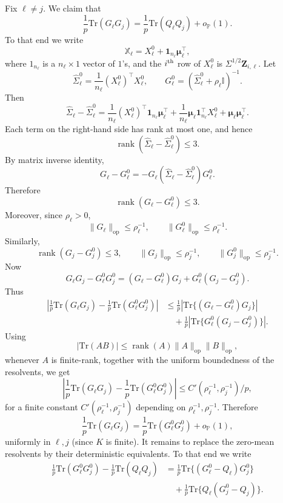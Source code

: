 \documentclass{article}
\theoremstyle{plain}
\theoremstyle{remark}
\def \bZ{\mathbf{Z}}
\def \tr {\mathrm{Tr}}
\def \I{\mathcal{I}}
\def \P{\mathbb{P}}
\def \bmu{\pmb{\mu}}
\def \bZ {{\boldsymbol{Z}}}
\def \I {\mathbb{I}}
\begin{document}
Fix \(\ell\neq j\). We claim that
\[
\frac{1}{p}\tr(G_\ell G_j)
=
\frac{1}{p}\tr(Q_\ell Q_j)
+
o_{\P}(1).
\]
To that end we write
\[
\mathbb{X}_\ell=X_\ell^0+\mathbf 1_{n_\ell}\bmu_\ell^\top,
\]
where $1_{n_\ell}$ is a $n_{\ell}\times 1$ vector of $1$'s, and the $i^{\rm th}$ row of \(X_\ell^0\) is \(\Sigma^{1/2}\bZ_{i,\ell}\). Let
\[
\widehat\Sigma_\ell^0
=
\frac{1}{n_\ell}(X_\ell^0)^\top X_\ell^0,
\qquad
G_\ell^0
=
(\widehat\Sigma_\ell^0+\rho_\ell \I)^{-1}.
\]
Then
\[
\widehat\Sigma_\ell-\widehat\Sigma_\ell^0
=
\frac{1}{n_\ell}(X_\ell^0)^\top \mathbf 1_{n_\ell}\bmu_\ell^\top
+
\frac{1}{n_\ell}\bmu_\ell\mathbf 1_{n_\ell}^\top X_\ell^0
+
\bmu_\ell\bmu_\ell^\top .
\]
Each term on the right-hand side has rank at most one, and hence
\[
\operatorname{rank}(\widehat\Sigma_\ell-\widehat\Sigma_\ell^0)\leq 3.
\]
By matrix inverse identity,
\[
G_\ell-G_\ell^0
=
-G_\ell(\widehat\Sigma_\ell-\widehat\Sigma_\ell^0)G_\ell^0.
\]
Therefore
\[
\operatorname{rank}(G_\ell-G_\ell^0)\leq 3.
\]
Moreover, since \(\rho_\ell>0\), 
\[
\|G_\ell\|_{\mathrm{op}}\leq \rho_\ell^{-1},
\qquad
\|G_\ell^0\|_{\mathrm{op}}\leq \rho_\ell^{-1}.
\]
Similarly,
\[
\operatorname{rank}(G_j-G_j^0)\leq 3,
\qquad
\|G_j\|_{\mathrm{op}}\leq \rho_j^{-1},
\qquad
\|G_j^0\|_{\mathrm{op}}\leq \rho_j^{-1}.
\]
Now
\[
G_\ell G_j-G_\ell^0G_j^0
=
(G_\ell-G_\ell^0)G_j
+
G_\ell^0(G_j-G_j^0).
\]
Thus
\[
\begin{aligned}
\left|
\frac{1}{p}\tr(G_\ell G_j)
-
\frac{1}{p}\tr(G_\ell^0G_j^0)
\right|
&\leq
\frac{1}{p}
\left|
\tr\{(G_\ell-G_\ell^0)G_j\}
\right|
\\
&\quad+
\frac{1}{p}
\left|
\tr\{G_\ell^0(G_j-G_j^0)\}
\right| .
\end{aligned}
\]
Using
\[
|\tr(AB)|
\leq
\operatorname{rank}(A)\|A\|_{\mathrm{op}}\|B\|_{\mathrm{op}},
\]
whenever \(A\) is finite-rank, together with the uniform boundedness of the resolvents, we get
\[
\left|
\frac{1}{p}\tr(G_\ell G_j)
-
\frac{1}{p}\tr(G_\ell^0G_j^0)
\right|
\leq C'(\rho_{\ell}^{-1},\rho_{j}^{-1})/p,
\]
for a finite constant $C'(\rho_{\ell}^{-1},\rho_{j}^{-1})$ depending on $\rho_{\ell}^{-1},\rho_{j}^{-1}$. Therefore
\[
\frac{1}{p}\tr(G_\ell G_j)
=
\frac{1}{p}\tr(G_\ell^0G_j^0)
+
o_{\P}(1),
\]
uniformly in $\ell,j$ (since $K$ is finite). It remains to replace the zero-mean resolvents by their deterministic equivalents. To that end we write
\[
\begin{aligned}
\frac{1}{p}\tr(G_\ell^0G_j^0)
-
\frac{1}{p}\tr(Q_\ell Q_j)
&=
\frac{1}{p}\tr\{(G_\ell^0-Q_\ell)G_j^0\}
\\
&\quad+
\frac{1}{p}\tr\{Q_\ell(G_j^0-Q_j)\}.
\end{aligned}
\]
\end{document}
